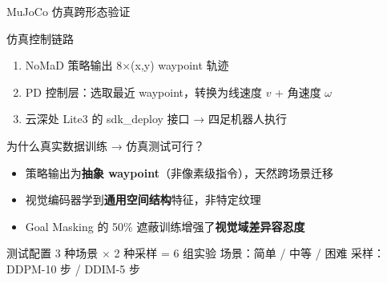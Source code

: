 \documentclass[aspectratio=169,10pt]{beamer}
\begin{document}
\begin{frame}{MuJoCo 仿真跨形态验证}
\begin{block}{仿真控制链路}
\begin{enumerate}
\item NoMaD 策略输出 8$\times$(x,y) waypoint 轨迹
\item PD 控制层：选取最近 waypoint，转换为线速度 $v$ + 角速度 $\omega$
\item 云深处 Lite3 的 sdk\_deploy 接口 → 四足机器人执行
\end{enumerate}
\end{block}
\pause
\begin{exampleblock}{为什么真实数据训练 → 仿真测试可行？}
\begin{itemize}
\item 策略输出为\textbf{抽象 waypoint}（非像素级指令），天然跨场景迁移
\item 视觉编码器学到\textbf{通用空间结构}特征，非特定纹理
\item Goal Masking 的 50\% 遮蔽训练增强了\textbf{视觉域差异容忍度}
\end{itemize}
\end{exampleblock}
\pause
\begin{block}{测试配置}
3 种场景 $\times$ 2 种采样 = 6 组实验 \quad
{\small 场景：简单 / 中等 / 困难 \quad 采样：DDPM-10 步 / DDIM-5 步}
\end{block}
\end{frame}
\end{document}
